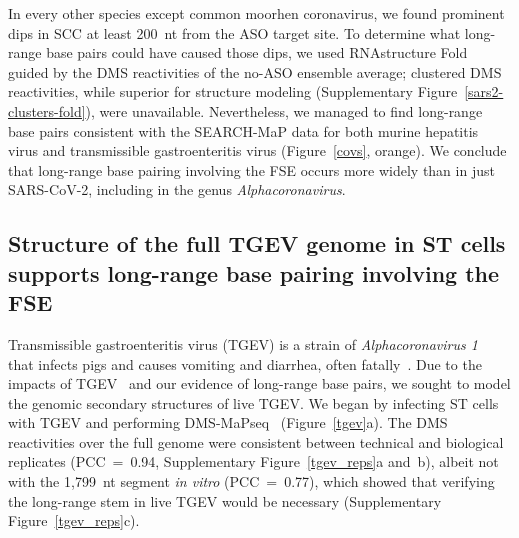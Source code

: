 \documentclass[main.tex]{subfiles}
\begin{document}
In every other species except common moorhen coronavirus, we found prominent dips in SCC at least 200~nt from the ASO target site.
To determine what long-range base pairs could have caused those dips, we used RNAstructure Fold~\cite{Reuter2010,Cordero2012} guided by the DMS reactivities of the no-ASO ensemble average; clustered DMS reactivities, while superior for structure modeling (Supplementary Figure~\ref{sars2-clusters-fold}), were unavailable.
Nevertheless, we managed to find long-range base pairs consistent with the SEARCH-MaP data for both murine hepatitis virus and transmissible gastroenteritis virus (Figure~\ref{covs}, orange).
We conclude that long-range base pairing involving the FSE occurs more widely than in just SARS-CoV-2, including in the genus \textit{Alphacoronavirus}.

\subsection{Structure of the full TGEV genome in ST cells supports long-range base pairing involving the FSE}

Transmissible gastroenteritis virus (TGEV) is a strain of \textit{Alphacoronavirus 1}~\cite{Whittaker2018} that infects pigs and causes vomiting and diarrhea, often fatally~\cite{Liu2021}.
Due to the impacts of TGEV~\cite{Liu2021} and our evidence of long-range base pairs, we sought to model the genomic secondary structures of live TGEV.
We began by infecting ST cells with TGEV and performing DMS-MaPseq~\cite{Zubradt2016} (Figure~\ref{tgev}a).
The DMS reactivities over the full genome were consistent between technical and biological replicates (PCC~=~0.94, Supplementary Figure~\ref{tgev_reps}a and~b), albeit not with the 1,799~nt segment \textit{in vitro} (PCC~=~0.77), which showed that verifying the long-range stem in live TGEV would be necessary (Supplementary Figure~\ref{tgev_reps}c).
\end{document}
